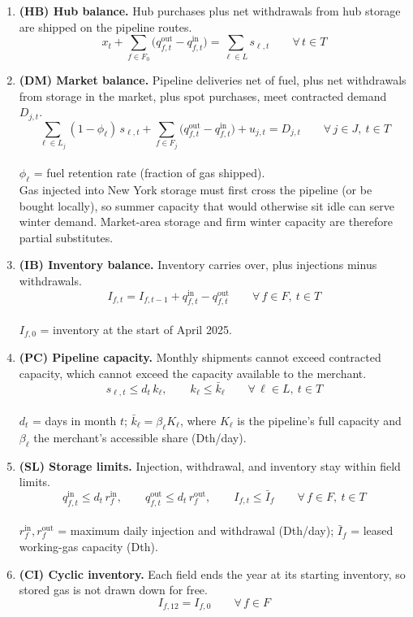 \documentclass[11pt]{article}
\newcommand{\head}[1]{\needspace{5\baselineskip}\vspace{0.5em}\noindent{\large\bfseries\color{navy}\uline{#1}}\par\vspace{0.15em}}
\newcommand{\note}[1]{\\[-0.2em]{\small\color{black!70}#1}}
\begin{document}
\head{Constraints}
\vspace{-0.4\baselineskip}
\begin{enumerate}[leftmargin=1cm, label=--]
  \item \textbf{(HB) Hub balance.} Hub purchases plus net withdrawals from hub storage are shipped
        on the pipeline routes.
  \[ x_t + \sum_{f\in F_0}\big(q^{\mathrm{out}}_{f,t} - q^{\mathrm{in}}_{f,t}\big) = \sum_{\ell\in L} s_{\ell,t} \qquad \forall\, t\in T \]

  \item \textbf{(DM) Market balance.} Pipeline deliveries net of fuel, plus net withdrawals from
        storage in the market, plus spot purchases, meet contracted demand $D_{j,t}$.
  \[ \sum_{\ell\in L_j} (1-\phi_\ell)\, s_{\ell,t}
     + \sum_{f\in F_j}\big(q^{\mathrm{out}}_{f,t} - q^{\mathrm{in}}_{f,t}\big)
     + u_{j,t} = D_{j,t} \qquad \forall\, j\in J,\ t\in T \]
  \vspace{-0.6\baselineskip}
  \note{$\phi_\ell$ = fuel retention rate (fraction of gas shipped).}
  \\[0.2em]
  {\small Gas injected into New York storage must first cross the pipeline (or be bought locally), so
  summer capacity that would otherwise sit idle can serve winter demand. Market-area storage and firm
  winter capacity are therefore partial substitutes.}

  \item \textbf{(IB) Inventory balance.} Inventory carries over, plus injections minus withdrawals.
  \[ I_{f,t} = I_{f,t-1} + q^{\mathrm{in}}_{f,t} - q^{\mathrm{out}}_{f,t} \qquad \forall\, f\in F,\ t\in T \]
  \vspace{-0.6\baselineskip}
  \note{$I_{f,0}$ = inventory at the start of April 2025.}

  \item \textbf{(PC) Pipeline capacity.} Monthly shipments cannot exceed contracted capacity, which
        cannot exceed the capacity available to the merchant.
  \[ s_{\ell,t} \le d_t\, k_\ell, \qquad k_\ell \le \bar{k}_\ell \qquad \forall\, \ell\in L,\ t\in T \]
  \vspace{-0.6\baselineskip}
  \note{$d_t$ = days in month $t$; $\bar{k}_\ell = \beta_\ell K_\ell$, where $K_\ell$ is the pipeline's
        full capacity and $\beta_\ell$ the merchant's accessible share (Dth/day).}

  \item \textbf{(SL) Storage limits.} Injection, withdrawal, and inventory stay within field limits.
  \[ q^{\mathrm{in}}_{f,t} \le d_t\, r^{\mathrm{in}}_f, \qquad
     q^{\mathrm{out}}_{f,t} \le d_t\, r^{\mathrm{out}}_f, \qquad
     I_{f,t} \le \bar{I}_f \qquad \forall\, f\in F,\ t\in T \]
  \vspace{-0.6\baselineskip}
  \note{$r^{\mathrm{in}}_f, r^{\mathrm{out}}_f$ = maximum daily injection and withdrawal (Dth/day);
        $\bar{I}_f$ = leased working-gas capacity (Dth).}

  \item \textbf{(CI) Cyclic inventory.} Each field ends the year at its starting inventory, so stored
        gas is not drawn down for free.
  \[ I_{f,12} = I_{f,0} \qquad \forall\, f\in F \]
\end{enumerate}
\end{document}
